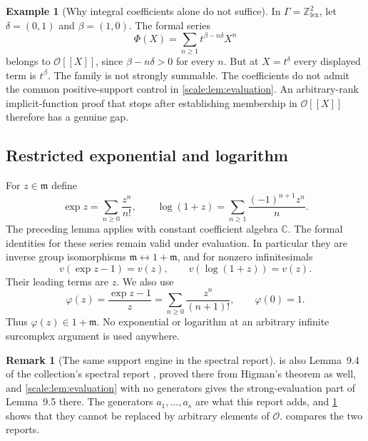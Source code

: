 \documentclass[11pt,a4paper]{article}
\numberwithin{equation}{section}
\theoremstyle{definition}
\newtheorem{example}[theorem]{Example}
\newtheorem{remark}[theorem]{Remark}
\newcommand{\C}{\mathbb C}
\newcommand{\Z}{\mathbb Z}
\newcommand{\OO}{\mathcal O}
\newcommand{\mm}{\mathfrak m}
\newcommand{\ph}{\varphi}
\begin{document}
\begin{example}[Why integral coefficients alone do not suffice]
\label{scale:ex:badformal}
In $\Gamma=\Z^2_{\mathrm{lex}}$, let
$\delta=(0,1)$ and $\beta=(1,0)$. The formal series
\[
 \Phi(X)=\sum_{n\geq1} t^{\beta-n\delta}X^n
\]
belongs to $\OO[[X]]$, since $\beta-n\delta>0$ for every $n$.
But at $X=t^\delta$ every displayed term is $t^\beta$.
The family is not strongly summable. The coefficients do not admit
the common positive-support control in \cref{scale:lem:evaluation}.
An arbitrary-rank implicit-function proof that stops after establishing
membership in $\OO[[X]]$ therefore has a genuine gap.
\end{example}

\subsection{Restricted exponential and logarithm}
For $z\in\mm$ define
\begin{equation}\label{scale:eq:explog}
 \exp z=\sum_{n\geq0}\frac{z^n}{n!},\qquad
 \log(1+z)=\sum_{n\geq1}\frac{(-1)^{n+1}z^n}{n}.
\end{equation}
The preceding lemma applies with constant coefficient algebra $\C$.
The formal identities for these series remain valid under evaluation.
In particular they are inverse group isomorphisms
$\mm\leftrightarrow1+\mm$, and for nonzero infinitesimals
\begin{equation}\label{scale:eq:valexplog}
 v(\exp z-1)=v(z),\qquad v(\log(1+z))=v(z).
\end{equation}
Their leading terms are $z$. We also use
\begin{equation}\label{scale:eq:phi}
 \ph(z)=\frac{\exp z-1}{z}
       =\sum_{n\geq0}\frac{z^n}{(n+1)!},\qquad \ph(0)=1.
\end{equation}
Thus $\ph(z)\in1+\mm$. No exponential or logarithm at an arbitrary
infinite surcomplex argument is used anywhere.

\begin{remark}[The same support engine in the spectral report]
\label{scale:rem:support}
 is also Lemma~9.4 of the collection's spectral
report \cite{RepoSpectral}, proved there from Higman's theorem as well, and
\cref{scale:lem:evaluation} with no generators gives the strong-evaluation
part of Lemma~9.5 there. The generators $a_1,\ldots,a_s$ are what this
report adds, and \cref{scale:ex:badformal} shows that they cannot be replaced
by arbitrary elements of $\OO$.  compares the
two reports.
\end{remark}
\end{document}
